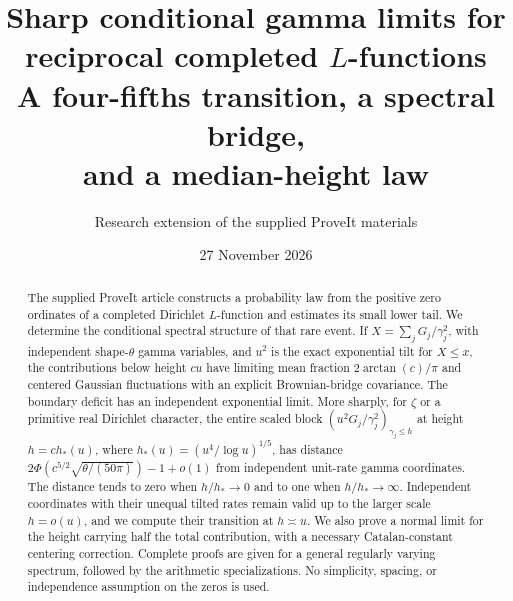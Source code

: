 \documentclass[11pt]{article}
\title{\textcolor{ink}{Sharp conditional gamma limits for\\reciprocal completed $L$-functions}\\[0.5em]
 \large A four-fifths transition, a spectral bridge,\\and a median-height law}
\author{Research extension of the supplied ProveIt materials}
\date{27 November 2026}
\theoremstyle{definition}
\theoremstyle{remark}
\begin{document}
\maketitle
\begin{abstract}
The supplied ProveIt article constructs a probability law from the positive
zero ordinates of a completed Dirichlet $L$-function and estimates its small
lower tail. We determine the conditional spectral structure of that rare
event. If $X=\sum_jG_j/\gamma_j^2$, with independent shape-$\theta$ gamma
variables, and $u^2$ is the exact exponential tilt for $X\le x$, the
contributions below height $cu$ have limiting mean fraction
$2\arctan(c)/\pi$ and centered Gaussian fluctuations with an explicit
Brownian-bridge covariance. The boundary deficit has an independent
exponential limit. More sharply, for $\zeta$ or a primitive real
Dirichlet character, the entire scaled block
$(u^2G_j/\gamma_j^2)_{\gamma_j\le h}$ at height
$h=ch_*(u)$, where $h_*(u)=(u^4/\log u)^{1/5}$, has distance
$2\Phi(c^{5/2}\sqrt{\theta/(50\pi)})-1+o(1)$ from independent unit-rate
gamma coordinates. The distance tends to zero when $h/h_*\to0$ and
to one when $h/h_*\to\infty$. Independent coordinates with their unequal tilted
rates remain valid up to the larger scale $h=o(u)$, and we compute their
transition at $h\asymp u$. We also prove a normal limit for the height
carrying half the total contribution, with a necessary Catalan-constant
centering correction. Complete proofs are given for a general regularly
varying spectrum, followed by the arithmetic specializations. No
simplicity, spacing, or independence assumption on the zeros is used.
\end{abstract}
\setcounter{tocdepth}{1}
\tableofcontents





\end{document}
